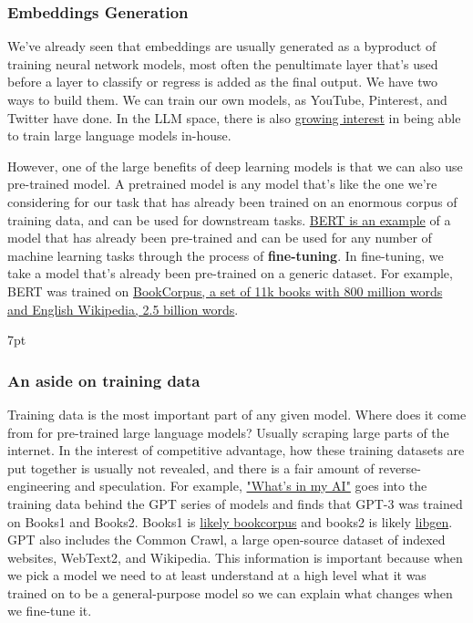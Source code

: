 \documentclass[11pt, table]{diazessay} %
\newenvironment{formal}{%
  \def\FrameCommand{%
	\hspace{1pt}%
	{\color{w_lightblue}\vrule width 2pt}%
	{\color{formalshade}\vrule width 4pt}%
	\colorbox{formalshade}%
  }%
  \MakeFramed{\advance\hsize-\width\FrameRestore}%
  \noindent\hspace{-4.55pt}%
  \begin{adjustwidth}{}{7pt}%
  \vspace{2pt}\vspace{2pt}%
}
{%
  \vspace{2pt}\end{adjustwidth}\endMakeFramed%
}
\begin{document}
\begin{sloppypar}
\subsubsection{Embeddings Generation}

We've already seen that embeddings are usually generated as a byproduct of training neural network models, most often the penultimate layer that's used before a layer to classify or regress is added as the final output. We have two ways to build them. We can train our own models, as YouTube, Pinterest, and Twitter have done. In the LLM space, there is also \href{https://blog.replit.com/llm-training}{growing interest} in being able to train large language models in-house.

However, one of the large benefits of deep learning models is that we can also use pre-trained model. A pretrained model is any model that's like the one we're considering for our task that has already been trained on an enormous corpus of training data, and can be used for downstream tasks. \href{https://huggingface.co/docs/transformers/model_doc/bert}{BERT is an example} of a model that has already been pre-trained and can be used for any number of machine learning tasks through the process of \textbf{fine-tuning}. In fine-tuning, we take a model that's already been pre-trained on a generic dataset. For example, BERT was trained on \href{https://resources.wolframcloud.com/NeuralNetRepository/resources/BERT-Trained-on-BookCorpus-and-English-Wikipedia-Data}{BookCorpus, a set of 11k books with 800 million words and English Wikipedia, 2.5 billion words}.


\begin{formal}
\subsubsection*{An aside on training data}
Training data is the most important part of any given model. Where does it come from for pre-trained large language models? Usually scraping large parts of the internet. In the interest of competitive advantage, how these training datasets are put together is usually not revealed, and there is a fair amount of reverse-engineering and speculation. For example, \href{https://s10251.pcdn.co/pdf/2022-Alan-D-Thompson-Whats-in-my-AI-Rev-0.pdf}{"What's in my AI"} goes into the training data behind the GPT series of models and finds that GPT-3 was trained on Books1 and Books2. Books1 is \href{https://github.com/soskek/bookcorpus/issues/27#issuecomment-716104208}{likely bookcorpus} and books2 is likely \href{https://en.wikipedia.org/wiki/Library_Genesis}{libgen}. GPT also includes the Common Crawl, a large open-source dataset of indexed websites, WebText2, and Wikipedia. This information is important because when we pick  a model we need to at least understand at a high level what it was trained on to be a general-purpose model so we can explain what changes when we fine-tune it.
\end{formal}


\end{sloppypar}
\end{document}

